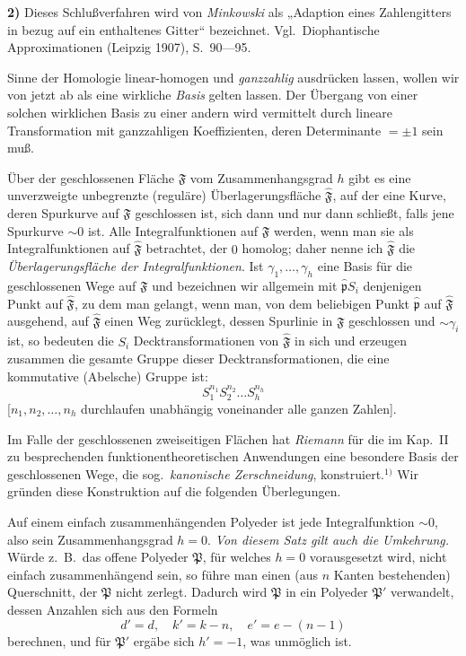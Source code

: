 \documentclass{article}
\begin{document}
\textbf{2)} Dieses Schlußverfahren wird von \emph{Minkowski} als „Adaption eines Zahlengitters in bezug auf ein enthaltenes Gitter“ bezeichnet. Vgl.\ Diophantische Approximationen (Leipzig 1907), S.~90---95.

Sinne der Homologie linear-homogen und \emph{ganzzahlig} ausdrücken lassen, wollen wir von jetzt ab als eine wirkliche \emph{Basis} gelten lassen. Der Übergang von einer solchen wirklichen Basis zu einer andern wird vermittelt durch lineare Transformation mit ganzzahligen Koeffizienten, deren Determinante $= \pm 1$ sein muß.

Über der geschlossenen Fläche $\mathfrak{F}$ vom Zusammenhangsgrad $h$ gibt es eine unverzweigte unbegrenzte (reguläre) Überlagerungsfläche $\hat{\mathfrak{F}}$, auf der eine Kurve, deren Spurkurve auf $\mathfrak{F}$ geschlossen ist, sich dann und nur dann schließt, falls jene Spurkurve $\sim 0$ ist. Alle Integralfunktionen auf $\mathfrak{F}$ werden, wenn man sie als Integralfunktionen auf $\hat{\mathfrak{F}}$ betrachtet, der $0$ homolog; daher nenne ich $\hat{\mathfrak{F}}$ die \emph{Überlagerungsfläche der Integralfunktionen}. Ist $\gamma_1, \dots, \gamma_h$ eine Basis für die geschlossenen Wege auf $\mathfrak{F}$ und bezeichnen wir allgemein mit $\hat{\mathfrak{p}} S_i$ denjenigen Punkt auf $\hat{\mathfrak{F}}$, zu dem man gelangt, wenn man, von dem beliebigen Punkt $\hat{\mathfrak{p}}$ auf $\hat{\mathfrak{F}}$ ausgehend, auf $\hat{\mathfrak{F}}$ einen Weg zurücklegt, dessen Spurlinie in $\mathfrak{F}$ geschlossen und $\sim \gamma_i$ ist, so bedeuten die $S_i$ Decktransformationen von $\hat{\mathfrak{F}}$ in sich und erzeugen zusammen die gesamte Gruppe dieser Decktransformationen, die eine kommutative (Abelsche) Gruppe ist:
\[ S_1^{n_1} S_2^{n_2} \dots S_h^{n_h} \]
[$n_1, n_2, \dots, n_h$ durchlaufen unabhängig voneinander alle ganzen Zahlen].

Im Falle der geschlossenen zweiseitigen Flächen hat \emph{Riemann} für die im Kap.~II zu besprechenden funktionentheoretischen Anwendungen eine besondere Basis der geschlossenen Wege, die sog.\ \emph{kanonische Zerschneidung}, konstruiert.${}^{1)}$ Wir gründen diese Konstruktion auf die folgenden Überlegungen.

Auf einem einfach zusammenhängenden Polyeder ist jede Integralfunktion $\sim 0$, also sein Zusammenhangsgrad $h = 0$. \emph{Von diesem Satz gilt auch die Umkehrung.} Würde z.~B.\ das offene Polyeder $\mathfrak{P}$, für welches $h = 0$ vorausgesetzt wird, nicht einfach zusammenhängend sein, so führe man einen (aus $n$ Kanten bestehenden) Querschnitt, der $\mathfrak{P}$ nicht zerlegt. Dadurch wird $\mathfrak{P}$ in ein Polyeder $\mathfrak{P}'$ verwandelt, dessen Anzahlen sich aus den Formeln
\[ d' = d, \quad k' = k - n, \quad e' = e - (n - 1) \]
berechnen, und für $\mathfrak{P}'$ ergäbe sich $h' = - 1$, was unmöglich ist.
\end{document}
